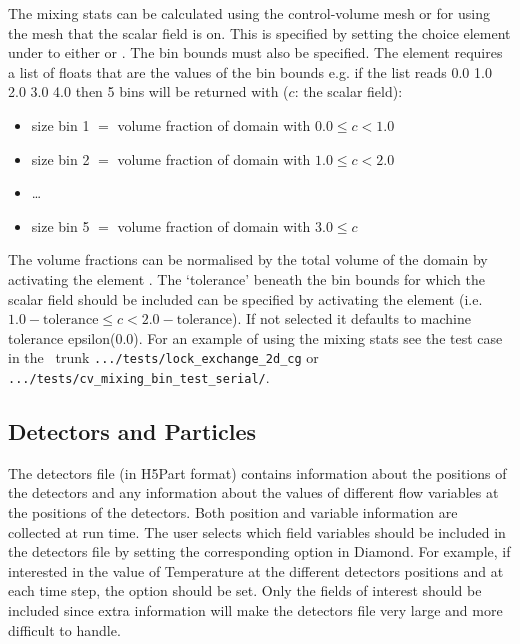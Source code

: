 The mixing stats can be calculated using the control-volume mesh or for \Poo using the mesh that the scalar field is on. This is specified by setting the choice element under  to either  or . The bin bounds must also be specified.  The element  requires a list of floats that are the values of the bin bounds e.g. if the list reads 0.0 1.0 2.0 3.0 4.0 then 5 bins will be returned with ($c$: the scalar field):
\begin{itemize}
\item size bin 1 $=$ volume fraction of domain with $0.0\leq c < 1.0$
\item size bin 2 $=$ volume fraction of domain with $1.0\leq c < 2.0$
\item \ldots
\item size bin 5 $=$ volume fraction of domain with $3.0\leq c$
\end{itemize}

The volume fractions can be normalised by the total volume of the domain by activating the element . The `tolerance' beneath the bin bounds for which the scalar field should be included can be specified by activating the element  (i.e. $1.0-\mathrm{tolerance} \leq c < 2.0-\mathrm{tolerance}$). If not selected it defaults to machine tolerance epsilon(0.0). For an example of using the mixing stats see the test case in the \fluidity\ trunk \lstinline[language = bash]+.../tests/lock_exchange_2d_cg+ or \lstinline[language = bash]+.../tests/cv_mixing_bin_test_serial/+.

\subsection{Detectors and Particles}
\label{sec:diagnostics_detectors}
The detectors file (in H5Part format) contains information about the positions of the detectors and any information about the values of different flow variables at the positions of the detectors.
Both position and variable information are collected at run time. The user selects which field variables should be included in the detectors file by setting the corresponding option in Diamond. For example, if interested in the value of Temperature at the different detectors positions and at each time step, the option   should be set. Only the fields of interest should be included since extra information will make the detectors file very large and more difficult to handle.

